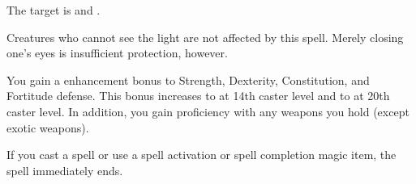 \begin{spellsuccess}
    The target is \dazzled and \bewildered.
\end{spellsuccess}
\begin{spellnotes}
    Creatures who cannot see the light are not affected by this spell. Merely closing one's eyes is insufficient protection, however.
\end{spellnotes}

\spelldur{\durshort \dismissable}
\begin{spelleffect}
    You gain a  enhancement bonus to Strength, Dexterity, Constitution, and Fortitude defense. This bonus increases to  at 14th caster level and to  at 20th caster level. In addition, you gain proficiency with any weapons you hold (except exotic weapons).
\end{spelleffect}
\begin{spellnotes}
    If you cast a spell or use a spell activation or spell completion magic item, the spell immediately ends.
\end{spellnotes}

